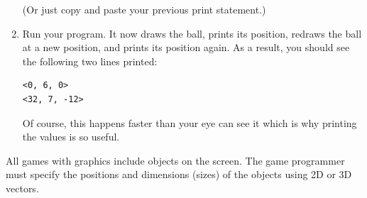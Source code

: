 \begin{enumerate}
(Or just copy and paste your previous print statement.)

	\item Run your program. It now draws the ball, prints its position, redraws the ball at a new position, and prints its position again. As a result, you should see the following two lines printed:
	
\begin{verbatim}
<0, 6, 0>
<32, 7, -12>
\end{verbatim}
	
	Of course, this happens faster than your eye can see it which is why printing the values is so useful.

\end{enumerate}

\analysis

All games with graphics include objects on the screen. The game programmer must specify the positions and dimensions (sizes) of the objects using 2D or 3D vectors.

